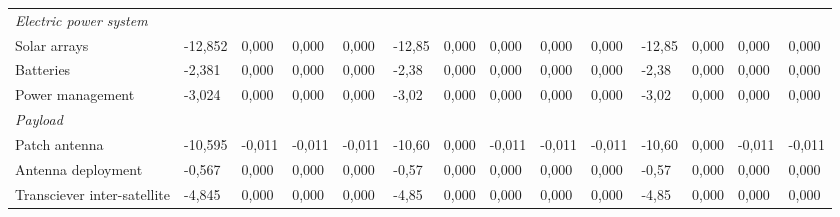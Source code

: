 \begin{landscape}
\begin{table}[]
{\begin{tabular}{|l|l|l|l|l|l|l|l|l|l|l|l|l|l|}
\textit{Electric power system}                                                         &                  &                 &                 &                 &                 &                 &                 &                 &                 &                 &                  &                  &                  \\
Solar arrays                                                                           & -12,852          & 0,000           & 0,000           & 0,000           & -12,85          & 0,000           & 0,000           & 0,000           & 0,000           & -12,85          & 0,000            & 0,000            & 0,000            \\
Batteries                                                                              & -2,381           & 0,000           & 0,000           & 0,000           & -2,38           & 0,000           & 0,000           & 0,000           & 0,000           & -2,38           & 0,000            & 0,000            & 0,000            \\
Power management                                                                       & -3,024           & 0,000           & 0,000           & 0,000           & -3,02           & 0,000           & 0,000           & 0,000           & 0,000           & -3,02           & 0,000            & 0,000            & 0,000            \\
\textit{Payload}                                                                       &                  &                 &                 &                 &                 &                 &                 &                 &                 &                 &                  &                  &                  \\
Patch antenna                                                                          & -10,595          & -0,011          & -0,011          & -0,011          & -10,60          & 0,000           & -0,011          & -0,011          & -0,011          & -10,60          & 0,000            & -0,011           & -0,011           \\
Antenna deployment                                                                     & -0,567           & 0,000           & 0,000           & 0,000           & -0,57           & 0,000           & 0,000           & 0,000           & 0,000           & -0,57           & 0,000            & 0,000            & 0,000            \\
Transciever inter-satellite                                                            & -4,845           & 0,000           & 0,000           & 0,000           & -4,85           & 0,000           & 0,000           & 0,000           & 0,000           & -4,85           & 0,000            & 0,000            & 0,000            \\

\end{tabular}}
\end{table}
\end{landscape}

